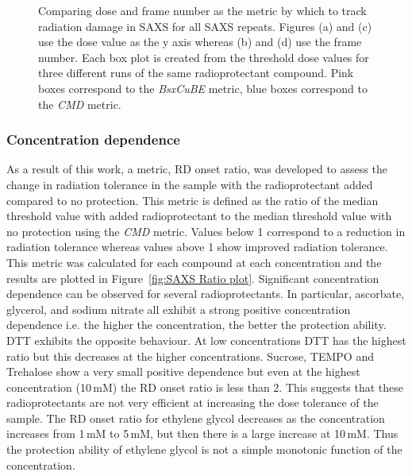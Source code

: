 \begin{figure}
\begin{subfigure}[b]{0.72\textwidth}
            \caption{}
            \label{fig:SAXS frame- 10mM}
    \end{subfigure}
    \caption[Comparing dose and frame number as the metric by which to track radiation damage in SAXS.]{Comparing dose and frame number as the metric by which to track radiation damage in SAXS for all SAXS repeats.
    Figures (a) and (c) use the dose value as the y axis whereas (b) and (d) use the frame number.
    Each box plot is created from the threshold dose values for three different runs of the same radioprotectant compound.
    Pink boxes correspond to the \textit{BsxCuBE} metric, blue boxes correspond to the \textit{CMD} metric.}
    \label{fig:SAXS dose vs frame}
\end{figure}

\subsubsection{Concentration dependence}
\label{subs:Concentration dependence}
As a result of this work, a metric, RD onset ratio, was developed to assess the change in radiation tolerance in the sample with the radioprotectant added compared to no protection.
This metric is defined as the ratio of the median threshold value with added radioprotectant to the median threshold value with no protection using the \textit{CMD} metric.
Values below 1 correspond to a reduction in radiation tolerance whereas values above 1 show improved radiation tolerance.
This metric was calculated for each compound at each concentration and the results are plotted in Figure~\ref{fig:SAXS Ratio plot}.
Significant concentration dependence can be observed for several radioprotectants.
In particular, ascorbate, glycerol, and sodium nitrate all exhibit a strong positive concentration dependence i.e. the higher the concentration, the better the protection ability.
DTT exhibits the opposite behaviour.
At low concentrations DTT has the highest ratio but this decreases at the higher concentrations.
Sucrose, TEMPO and Trehalose show a very small positive dependence but even at the highest concentration (10\,mM) the RD onset ratio is less than 2.
This suggests that these radioprotectants are not very efficient at increasing the dose tolerance of the sample.
The RD onset ratio for ethylene glycol decreases as the concentration increases from 1\,mM to 5\,mM, but then there is a large increase at 10$\,$mM.
Thus the protection ability of ethylene glycol is not a simple monotonic function of the concentration.
